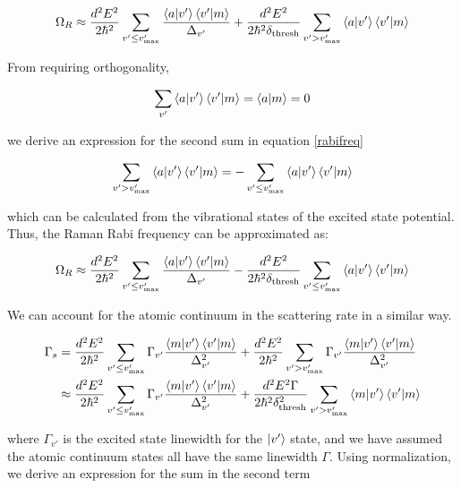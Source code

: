 \documentclass[aps,secnumarabic,amsmath,amssymb,superscriptaddress]{revtex4}
\begin{document}
\begin{equation}
\Omega_R \approx \frac{d^2E^2}{2\hbar^2}\displaystyle\sum_{v' \leq v'_{\text{max}}} \frac{\braket{a|v'}\braket{v'|m}}{\Delta_{v'}} +  \frac{d^2E^2}{2\hbar^2\delta_{\text{thresh}}}\displaystyle\sum_{v' > v'_{\text{max}}} \braket{a|v'}\braket{v'|m}  \label{rabifreq}
\end{equation}

From requiring orthogonality,

\begin{equation}
    \displaystyle\sum_{v'} \braket{a|v'}\braket{v'|m} = \braket{a|m} = 0
\end{equation}

we derive an expression for the second sum in equation \ref{rabifreq}

\begin{equation}
    \displaystyle\sum_{v'> v'_{\text{max}}} \braket{a|v'}\braket{v'|m} = -\displaystyle\sum_{v' \leq v'_{\text{max}}} \braket{a|v'}\braket{v'|m}
\end{equation}

which can be calculated from the vibrational states of the excited state potential. Thus, the Raman Rabi frequency can be approximated as:

\begin{equation}
\Omega_R \approx \frac{d^2E^2}{2\hbar^2}\displaystyle\sum_{v' \leq v'_{\text{max}}} \frac{\braket{a|v'}\braket{v'|m}}{\Delta_{v'}} -  \frac{d^2E^2}{2\hbar^2\delta_{\text{thresh}}}\displaystyle\sum_{v' \leq v'_{\text{max}}} \braket{a|v'}\braket{v'|m}  
\end{equation}

We can account for the atomic continuum in the scattering rate in a similar way. 

\begin{align}
    \Gamma_s &= \frac{d^2E^2}{2\hbar^2}\displaystyle\sum_{v' \leq v'_{\text{max}}}\Gamma_{v'} \frac{\braket{m|v'}\braket{v'|m}}{\Delta_{v'}^2} + \frac{d^2E^2}{2\hbar^2}\displaystyle\sum_{v' > v'_{\text{max}}}\Gamma_{v'} \frac{\braket{m|v'}\braket{v'|m}}{\Delta_{v'}^2} \\
     &\approx \frac{d^2E^2}{2\hbar^2}\displaystyle\sum_{v' \leq v'_{\text{max}}}\Gamma_{v'} \frac{\braket{m|v'}\braket{v'|m}}{\Delta_{v'}^2} + \frac{d^2E^2\Gamma}{2\hbar^2\delta_{\text{thresh}}^2}\displaystyle\sum_{v' > v'_{\text{max}}}\braket{m|v'}\braket{v'|m}
\end{align}

where $\Gamma_{v'}$ is the excited state linewidth for the $\ket{v'}$ state, and we have assumed the atomic continuum states all have the same linewidth $\Gamma$. Using normalization, we derive an expression for the sum in the second term
\end{document}
